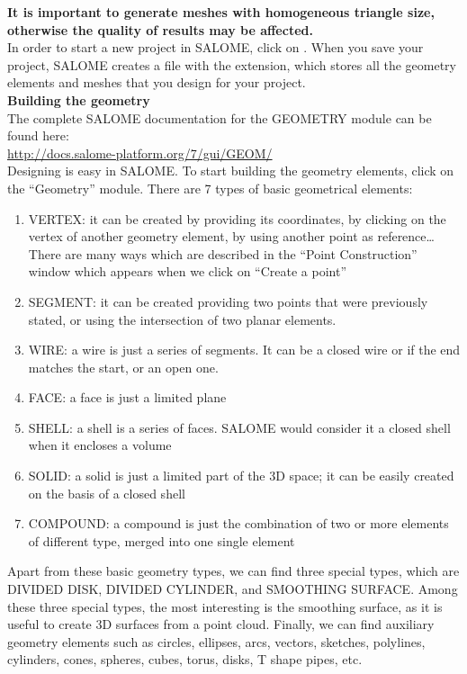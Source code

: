 \documentclass{../GPUSPHtemplate}
\begin{document}
\textbf{It is important to generate meshes with homogeneous 
triangle size, otherwise the quality of results may be affected.}\\


In order to start a new project in SALOME, click on . 
When you save your project, SALOME creates a file with the 
 extension, which stores all the geometry elements 
and meshes that you design for your project.\\

\textbf{Building the geometry}\\

The complete SALOME documentation for the GEOMETRY module can be found here:\\
\url{http://docs.salome-platform.org/7/gui/GEOM/}\\

Designing is easy in SALOME. To start building the geometry 
elements, click on the “Geometry” module. 
There are 7 types of basic geometrical elements:
\begin{enumerate}
\item VERTEX: it can be created by providing its coordinates, 
by clicking on the vertex of another geometry element, 
by using another point as reference…There are many ways 
which are described in the “Point Construction” window 
which appears when we click on “Create a point”
\item SEGMENT: it can be created providing two points 
that were previously stated, or using the intersection of 
two planar elements. 
\item WIRE: a wire is just a series of segments. 
It can be a closed wire or if the end matches the start, 
or an open one.
\item FACE: a face is just a limited plane 
\item SHELL: a shell is a series of faces. 
SALOME would consider it a closed shell when it 
encloses a volume
\item SOLID: a solid is just a limited part of the 3D space; 
it can be easily created on the basis of a closed shell
\item COMPOUND: a compound is just the combination 
of two or more elements of different type, merged 
into one single element
\end{enumerate}
Apart from these basic geometry types, we can find 
three special types, which are 
DIVIDED DISK, DIVIDED CYLINDER, and SMOOTHING SURFACE. 
Among these three special types, the most interesting 
is the smoothing surface, as it is useful to create 
3D surfaces from a point cloud.
Finally, we can find auxiliary geometry elements such as 
circles, ellipses, arcs, vectors, sketches, polylines, cylinders, 
cones, spheres, cubes, torus, disks, T shape pipes, etc.
\end{document}
